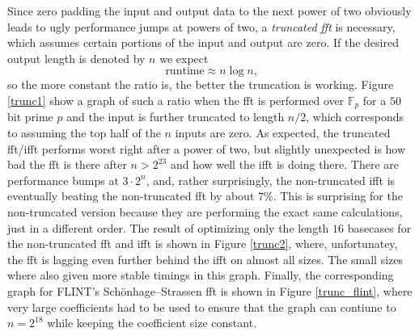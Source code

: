\documentclass[12 pt]{amsart}
\begin{document}
Since zero padding the input and output data to the next power of two obviously leads to ugly
performance jumps at powers of two, a \emph{truncated fft} is necessary, which assumes
certain portions of the input and output are zero. If the desired output length is denoted
by $n$ we expect
\begin{equation*}
\text{runtime} \approx n \log n\text{,}
\end{equation*}
so the more constant the ratio is, the better the truncation is working. Figure \ref{trunc1}
show a graph of such a ratio when the fft is performed over $\mathbb{F}_p$ for a $50$ bit
prime $p$ and the input is further truncated to length $n/2$, which
corresponds to assuming the top half of the $n$ inputs are zero. As expected, the truncated
fft/ifft performs worst right after a power of two, but slightly unexpected is how bad the
fft is there after $n>2^{23}$ and how well the ifft is doing there. There are performance
bumps at $3 \cdot 2^n$, and, rather surprisingly, the non-truncated ifft is eventually
beating the non-truncated fft by about $7\%$. This is surprising for the non-truncated
version because they are performing the exact same calculations, just in a different order.
The result of optimizing only the length $16$ basecases for the non-truncated fft and ifft
is shown in Figure \ref{trunc2}, where, unfortunatey, the fft is lagging even further behind
the ifft on almost all sizes. The small sizes where also given more stable timings in this
graph. Finally, the corresponding graph for FLINT's Sch\"onhage--Strassen fft is shown in
Figure \ref{trunc_flint}, where very large coefficients had to be used to ensure that the
graph can contiune to $n=2^{18}$ while keeping the coefficient size constant.
\end{document}
